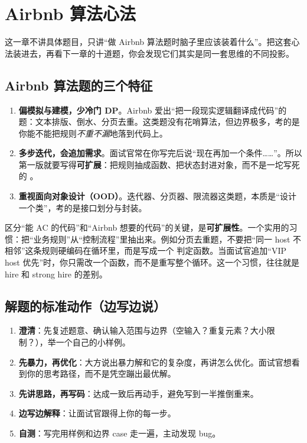 \chapter{Airbnb 算法心法}

这一章不讲具体题目，只讲“做 Airbnb 算法题时脑子里应该装着什么”。把这套心法装进去，再看下一章的十道题，你会发现它们其实是同一套思维的不同投影。

\section{Airbnb 算法题的三个特征}

\begin{enumerate}
  \item \textbf{偏模拟与建模，少冷门 DP}。Airbnb 爱出“把一段现实逻辑翻译成代码”的题：文本排版、倒水、分页去重。这类题没有花哨算法，但边界极多，考的是你能不能把规则\emph{不重不漏}地落到代码上。
  \item \textbf{多步迭代，会追加需求}。面试官常在你写完后说“现在再加一个条件……”。所以第一版就要写得\textbf{可扩展}：把规则抽成函数、把状态封进对象，而不是一坨写死的 。
  \item \textbf{重视面向对象设计（OOD）}。迭代器、分页器、限流器这类题，本质是“设计一个类”，考的是接口划分与封装。
\end{enumerate}

\begin{idea}
区分“能 AC 的代码”和“Airbnb 想要的代码”的关键，是\textbf{可扩展性}。一个实用的习惯：把“业务规则”从“控制流程”里抽出来。例如分页去重题，不要把“同一 host 不相邻”这条规则硬编码在循环里，而是写成一个  判定函数。当面试官追加“VIP host 优先”时，你只需改一个函数，而不是重写整个循环。这一个习惯，往往就是 hire 和 strong hire 的差别。
\end{idea}

\section{解题的标准动作（边写边说）}

\begin{enumerate}
  \item \textbf{澄清}：先复述题意、确认输入范围与边界（空输入？重复元素？大小限制？），举一个自己的小样例。
  \item \textbf{先暴力，再优化}：大方说出暴力解和它的复杂度，再讲怎么优化。面试官想看到你的思考路径，而不是凭空蹦出最优解。
  \item \textbf{先讲思路，再写码}：达成一致后再动手，避免写到一半推倒重来。
  \item \textbf{边写边解释}：让面试官跟得上你的每一步。
  \item \textbf{自测}：写完用样例和边界 case 走一遍，主动发现 bug。
\end{enumerate}

